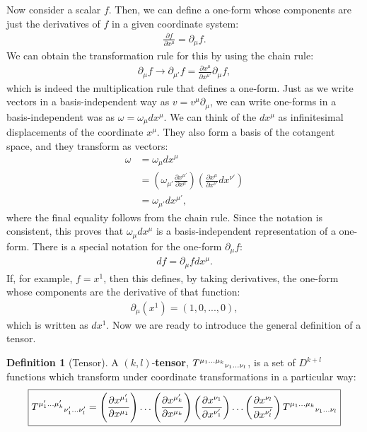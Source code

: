 \documentclass[11pt]{article}
\newcommand{\kltensor}[0]{\tensor{T}{^{\mu_1 ... \mu_k}}_{\nu_1 ... \nu_l}}
\theoremstyle{definition}
\newtheorem{definition}{Definition}[section]
\begin{document}
Now consider a scalar \( f \). Then, we can define a one-form whose components are just the derivatives of \( f \) in a given coordinate system:
\begin{align*}
	\frac{\partial f}{\partial x^\mu} = \partial_\mu f.
\end{align*}
We can obtain the transformation rule for this by using the chain rule:
\begin{align*}
	\partial_\mu f \rightarrow \partial_{\mu'} f = \frac{\partial x^\mu}{\partial x^{\mu'}} \partial_\mu f, 
\end{align*}
which is indeed the multiplication rule that defines a one-form. Just as we write vectors in a basis-independent way as \( v = v^\mu \partial_\mu \), we can write one-forms in a basis-independent was as \( \omega = \omega_\mu dx^\mu \). We can think of the \( dx^\mu \) as infinitesimal displacements of the coordinate \( x^\mu \). They also form a basis of the cotangent space, and they transform as vectors: 
\begin{align*}
	\omega &  = \omega_\mu  dx^\mu \\
		   & = \left( \omega_{\mu'} \frac{\partial x^{\mu'}}{\partial x^{\mu}	} \right) \left( \frac{\partial x^{\mu}}{\partial x^{\nu'}} dx^{\nu'} \right) \\
		   & = \omega_{\mu'} dx^{\mu'}, 
\end{align*}
where the final equality follows from the chain rule. Since the notation is consistent, this proves that  \(  \omega_\mu  dx^\mu \) is a basis-independent representation of a one-form. There is a special notation for the one-form \( \partial_\mu f \): 
\begin{align*}
	df = \partial_\mu f dx^\mu. 
\end{align*}
If, for example, \( f = x^1 \), then this defines, by taking derivatives, the one-form whose components are the derivative of that function: 
\begin{align*}
	\partial_\mu (x^1) = (1, 0, ..., 0), 
\end{align*}
which is written as \( dx^1 \). Now we are ready to introduce the general definition of a tensor. 
\begin{definition}[Tensor]\label{def:tensor}
	A \((k,l)\)-\textbf{tensor}, \( \tensor{T}{^{\mu_1 ... \mu_k}}_{\nu_1 ... \nu_l} \), is a set of \( D^{k+l} \) functions which transform under coordinate transformations in a particular way: 
	\begin{align*}
		 \boxed{ \tensor{T}{^{\mu_1' ... \mu_k'}}_{\nu_1' ... \nu_l'} = \left( \frac{\partial x^{\mu_1'}}{\partial x^{\mu_1}} \right)  \hdots \left( \frac{\partial x^{\mu_k'}}{\partial x^{\mu_k}} \right) \left( \frac{\partial x^{\nu_1}}{\partial x^{\nu_1'}} \right) \hdots \left( \frac{\partial x^{\nu_l}}{\partial x^{\nu_l'}} \right) \kltensor }
	\end{align*}
\end{definition}
\end{document}
